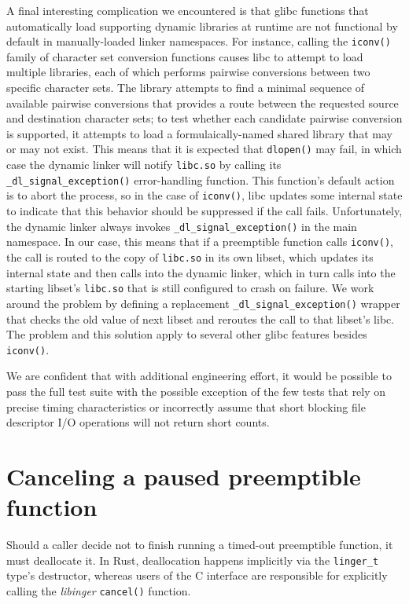 A final interesting complication we encountered is that glibc functions that
automatically load supporting dynamic libraries at runtime are not functional by
default in manually-loaded linker namespaces.  For instance, calling the
\texttt{iconv()} family of character set conversion functions causes libc to attempt
to load multiple libraries, each of which performs pairwise conversions between two
specific character sets.  The library attempts to find a minimal sequence of
available pairwise conversions that provides a route between the requested source and
destination character sets; to test whether each candidate pairwise conversion is
supported, it attempts to load a formulaically-named shared library that may or may
not exist.  This means that it is expected that \texttt{dlopen()} may fail, in which
case the dynamic linker will notify \texttt{libc.so} by calling its
\texttt{\_dl\_signal\_exception()} error-handling function.  This function's default
action is to abort the process, so in the case of \texttt{iconv()}, libc updates some
internal state to indicate that this behavior should be suppressed if the call fails.
Unfortunately, the dynamic linker always invokes \texttt{\_dl\_signal\_exception()}
in the main namespace.  In our case, this means that if a preemptible function calls
\texttt{iconv()}, the call is routed to the copy of \texttt{libc.so} in its own
libset, which updates its internal state and then calls into the dynamic linker,
which in turn calls into the starting libset's \texttt{libc.so} that is still
configured to crash on failure.  We work around the problem by defining a replacement
\texttt{\_dl\_signal\_exception()} wrapper that checks the old value of next libset
and reroutes the call to that libset's libc.  The problem and this solution apply to
several other glibc features besides \texttt{iconv()}.

We are confident that with additional engineering effort, it would be possible to
pass the full test suite with the possible exception of the few tests that rely on
precise timing characteristics or incorrectly assume that short blocking file
descriptor I/O operations will not return short counts.


\section{Canceling a paused preemptible function}
\label{sec:libinger:cancellation}

Should a caller decide not to finish running a timed-out preemptible function, it
must deallocate it.  In Rust, deallocation happens implicitly via the
\texttt{linger\_t} type's destructor, whereas users of the C interface are responsible
for explicitly calling the \textit{libinger} \texttt{cancel()} function.

